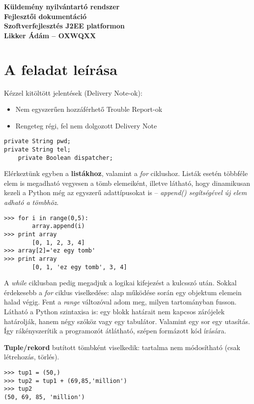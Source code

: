 \documentclass[a4paper,oneside,12pt]{article}
\begin{document}
\begin{titlepage}
	\pagestyle{empty}
	\begin{center}
		{\vfill \bf {\LARGE Küldemény nyilvántartó rendszer \\Fejlesztői dokumentáció\\[60pt]} \Large Szoftverfejlesztés J2EE platformon\\[90pt] Likker Ádám -- OXWQXX}
	\end{center}
	\newpage	
	\tableofcontents
\end{titlepage}
\section{A feladat leírása}
Kézzel kitöltött jelentések (Delivery Note-ok):
\begin{itemize}
	\item Nem egyszerűen hozzáférhető Trouble Report-ok
	\item Rengeteg régi, fel nem dolgozott Delivery Note
\end{itemize}
%
\begin{lstlisting}
private String pwd;
private String tel;
	private Boolean dispatcher;
\end{lstlisting}
Elérkeztünk egyben a \textbf{listákhoz}, valamint a \emph{for} ciklushoz. Listák esetén többféle elem is megadható vegyesen a tömb elemeiként, illetve látható, hogy dinamikusan kezeli a Python még az egyszerű adattípusokat is -- \emph{append() segítségével új elem adható a tömbhöz}.
\begin{lstlisting}
>>> for i in range(0,5):
		array.append(i)
>>> print array
		[0, 1, 2, 3, 4]
>>> array[2]='ez egy tomb'
>>> print array
		[0, 1, 'ez egy tomb', 3, 4]
\end{lstlisting}
A \emph{while} ciklusban pedig megadjuk a logikai kifejezést a kulcsszó után. Sokkal érdekesebb a \emph{for} ciklus viselkedése: alap működése során egy objektum elemein halad végig. Fent a \emph{range} változóval adom meg, milyen tartományban fusson. Látható a Python szintaxisa is: egy blokk határait nem kapcsos zárójelek határolják, hanem négy szóköz vagy egy tabulátor. Valamint egy sor egy utasítás. Így rákényszerítik a programozót átlátható, szépen formázott kód írására.

\textbf{Tuple/rekord} butított tömbként viselkedik: tartalma nem módosítható (csak létrehozás, törlés).
\begin{lstlisting}
>>> tup1 = (50,)
>>> tup2 = tup1 + (69,85,'million')
>>> tup2
(50, 69, 85, 'million')
\end{lstlisting}
\end{document}
